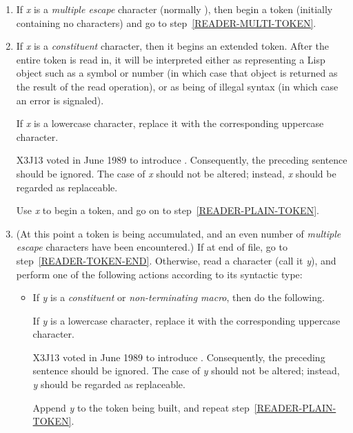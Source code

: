 \begin{enumerate}
\item
If \emph{x} is a \emph{multiple escape} character (normally \cd{|}),
then begin a token (initially
containing no characters) and go to step~\ref{READER-MULTI-TOKEN}.

\item
If \emph{x} is a \emph{constituent} character, then it begins an extended token.
\label{READER-CONSTITUENT}\relax
After the entire token is read in, it will be interpreted
either as representing a Lisp object such as a symbol or number
(in which case that object is returned as the result of the read operation),
or as being of illegal syntax (in which case an error is signaled).
\begin{obsolete}
If \emph{x} is a lowercase character, replace it with the
corresponding uppercase character.
\end{obsolete}
\begin{newer}
X3J13 voted in June 1989  to introduce
.  Consequently, the preceding sentence
should be ignored.  The case of \emph{x\/} should not be altered; instead,
\emph{x} should be regarded as replaceable.
\end{newer}
Use \emph{x} to begin a token, and go on to step~\ref{READER-PLAIN-TOKEN}.

\item
(At this point a token is being accumulated, and an even number
of \emph{multiple escape} characters have been encountered.)
If at end of file, go to step~\ref{READER-TOKEN-END}.
Otherwise, read a character (call it \emph{y}), and
perform one of the following actions according to its syntactic type:
\label{READER-PLAIN-TOKEN}
\begin{itemize}
\item
If \emph{y} is a \emph{constituent} or \emph{non-terminating macro},
then do the following.
\begin{obsolete}
If \emph{y} is a lowercase character, replace it with the
corresponding uppercase character.
\end{obsolete}
\begin{newer}
X3J13 voted in June 1989  to introduce
.  Consequently, the preceding sentence
should be ignored.  The case of \emph{y\/} should not be altered; instead,
\emph{y} should be regarded as replaceable.
\end{newer}
Append \emph{y} to the token being built,
and repeat step~\ref{READER-PLAIN-TOKEN}.


\end{itemize}
\end{enumerate}
